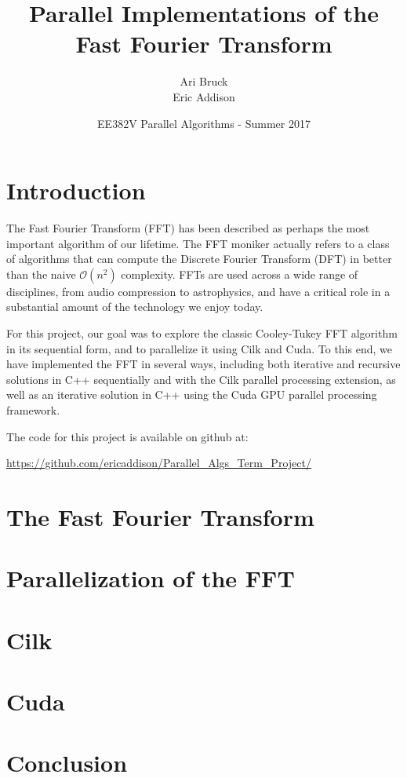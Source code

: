 \documentclass{article}
\title{Parallel Implementations of the\\Fast Fourier Transform}
\author{Ari Bruck\\Eric Addison }
\date{EE382V Parallel Algorithms - Summer 2017}
\begin{document}
\maketitle

\section{Introduction}
The Fast Fourier Transform (FFT) has been described as perhaps the most important algorithm of our lifetime. The FFT moniker actually refers to a class of algorithms that can compute the Discrete Fourier Transform (DFT) in better than the naive $\mathcal{O}(n^2)$ complexity. FFTs are used across a wide range of disciplines, from audio compression to astrophysics, and have a critical role in a substantial amount of the technology we enjoy today.

For this project, our goal was to explore the classic Cooley-Tukey FFT algorithm in its sequential form, and to parallelize it using Cilk and Cuda. To this end, we have implemented the FFT in several ways, including both iterative and recursive solutions in C++ sequentially and with the Cilk parallel processing extension, as well as an iterative solution in C++ using the Cuda GPU parallel processing framework.

The code for this project is available on github at: 
\begin{center}
\url{https://github.com/ericaddison/Parallel\_Algs\_Term\_Project/}
\end{center}


\section{The Fast Fourier Transform}


\section{Parallelization of the FFT}


\section{Cilk}


\section{Cuda}


\section{Conclusion}

\end{document}
